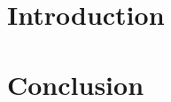 ﻿\documentclass[11pt]{article}
\title{\workingtitle}
\author{\authorplaceholder \\ \affiliationplaceholder}
\date{}
\begin{document}
\maketitle

\section{Introduction}
\nonfinalnote\par
[Section content placeholder. Full scaffold requires resolving underscore characters in file paths.]
\section{Conclusion}
\nonfinalnote\par
[Section content placeholder.]
\end{document}
